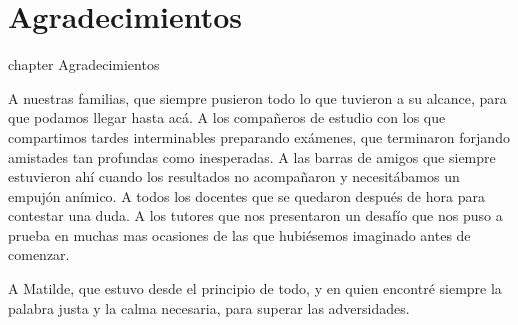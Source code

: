 \chapter*{Agradecimientos}
 {chapter} {Agradecimientos}%

A nuestras familias, que siempre pusieron todo lo que tuvieron a su alcance, para que podamos llegar hasta acá. A los compañeros de estudio con los que compartimos tardes interminables preparando exámenes, que terminaron forjando amistades tan profundas como inesperadas. A las barras de amigos que siempre estuvieron ahí cuando los resultados no acompañaron y necesitábamos un empujón anímico. A todos los docentes que se quedaron después de hora para contestar una duda. A los tutores que nos presentaron un desafío que nos puso a prueba en muchas mas ocasiones de las que hubiésemos imaginado antes de comenzar.

A Matilde, que estuvo desde el principio de todo, y en quien encontré siempre la palabra justa y la calma necesaria, para superar las adversidades.

